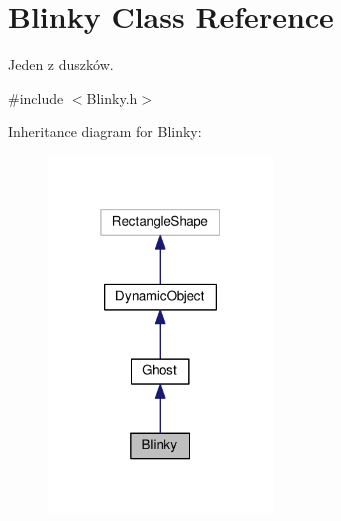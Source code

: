 \hypertarget{classBlinky}{}\section{Blinky Class Reference}
\label{classBlinky}


Jeden z duszków.  




{\ttfamily \#include $<$Blinky.\+h$>$}



Inheritance diagram for Blinky\+:\nopagebreak
\begin{figure}[H]
\begin{center}
\leavevmode
\includegraphics[width=169pt]{classBlinky__inherit__graph}
\end{center}
\end{figure}


